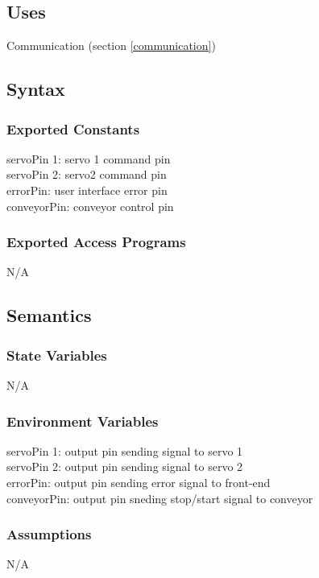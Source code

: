 \documentclass[12pt, titlepage]{article}
\begin{document}
\subsection{Uses}
Communication (section \ref{communication})

\subsection{Syntax}
\subsubsection{Exported Constants}
servoPin 1: servo 1 command pin\\
servoPin 2: servo2 command pin\\
errorPin: user interface error pin\\
conveyorPin: conveyor control pin\\
\subsubsection{Exported Access Programs}

N/A

\subsection{Semantics}
\subsubsection{State Variables}

N/A

\subsubsection{Environment Variables}

servoPin 1: output pin sending signal to servo 1\\
servoPin 2: output pin sending signal to servo 2\\
errorPin: output pin sending error signal to front-end\\
conveyorPin: output pin sneding stop/start signal to conveyor\\

\subsubsection{Assumptions}

N/A
\end{document}
